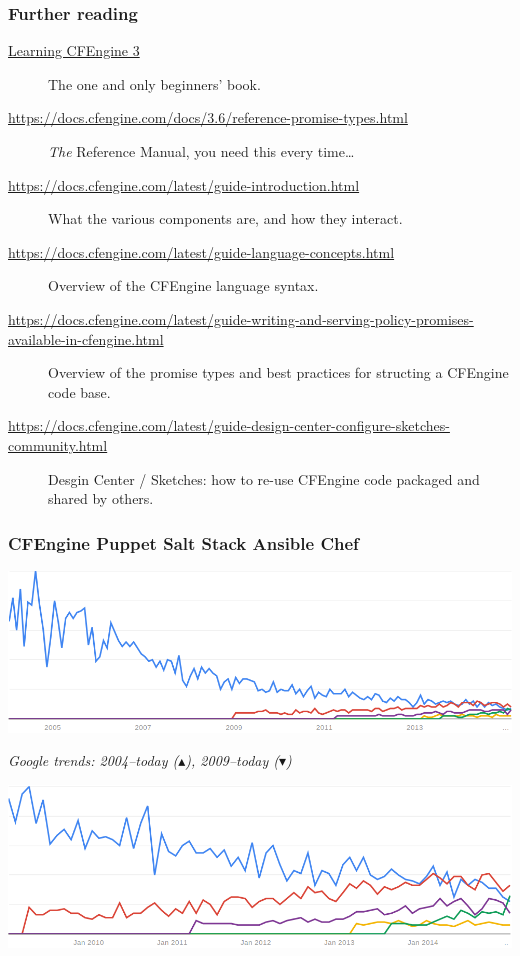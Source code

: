 \documentclass[english,serif,mathserif,usenames,dvipsnames]{beamer}
\begin{document}
\begin{frame}[fragile]
  \frametitle{Further reading}
  \footnotesize
  \begin{description}
    \item[\href{http://shop.oreilly.com/product/0636920022022.do}{Learning CFEngine 3}] The one and only beginners' book.
  \item[\url{https://docs.cfengine.com/docs/3.6/reference-promise-types.html}]
    \emph{The} Reference Manual, you need this every time\ldots
  \item[\url{https://docs.cfengine.com/latest/guide-introduction.html}]
    What the various components are, and how they interact.
  \item[\url{https://docs.cfengine.com/latest/guide-language-concepts.html}]
    Overview of the CFEngine language syntax.
  \item[\url{https://docs.cfengine.com/latest/guide-writing-and-serving-policy-promises-available-in-cfengine.html}]
    Overview of the promise types and best practices for structing a
    CFEngine code base.
  \item[\url{https://docs.cfengine.com/latest/guide-design-center-configure-sketches-community.html}]
    Desgin Center / Sketches: how to re-use CFEngine code packaged and shared by others.
  \end{description}
\end{frame}


\begin{frame}
  \frametitle{%
    {\color{blue} CFEngine}
    {\color{red} Puppet}
    {\color{yellow} Salt Stack}
    {\color{green} Ansible}
    {\color{violet} Chef}
  }%
  \begin{center}
    \includegraphics[width=1.0\linewidth]{google-trends-since-2004.png}

    {\footnotesize\em Google trends:
      2004--today ($\blacktriangle$),
      2009--today ($\blacktriangledown$)}

    \includegraphics[width=1.0\linewidth]{google-trends-since-2009.png}
  \end{center}
\end{frame}
\end{document}
